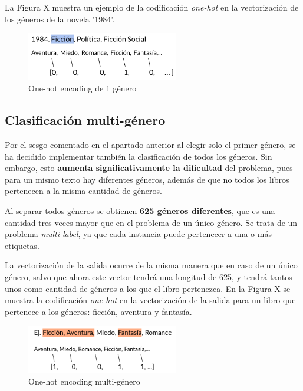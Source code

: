 \documentclass[12pt,a4paper, xcolor=table]{article}
\begin{document}
\vspace{3mm}

La Figura X muestra un ejemplo de la codificación \textit{one-hot} en la vectorización de los géneros de la novela '1984'.

  \begin{figure}[!h]
    \centering
    \includegraphics[width=250px]{img/1984_Genres.png}
    \caption{One-hot encoding de 1 género}
    \end{figure}

\newpage

\subsection{Clasificación multi-género}
Por el sesgo comentado en el apartado anterior al elegir solo el primer género, se ha decidido implementar también la clasificación de todos los géneros. Sin embargo, esto \textbf{aumenta significativamente la dificultad} del problema, pues para un mismo texto hay diferentes géneros, además de que no todos los libros pertenecen a la misma cantidad de géneros.

\vspace{3mm}

Al separar todos géneros se obtienen \textbf{625 géneros diferentes}, que es una cantidad tres veces mayor que en el problema de un único género. Se trata de un problema \textit{multi-label}, ya que cada instancia puede pertenecer a una o más etiquetas.

\vspace{3mm}

La vectorización de la salida ocurre de la misma manera que en caso de un único género, salvo que ahora este vector tendrá una longitud de 625, y tendrá tantos unos como cantidad de géneros a los que el libro pertenezca. En la Figura X se muestra la codificación \textit{one-hot} en la vectorización de la salida para un libro que pertenece a los géneros: ficción, aventura y fantasía.

  \begin{figure}[!h]
    \centering
    \includegraphics[width=250px]{img/ej_one_hot_multi.png}
    \caption{One-hot encoding multi-género}
    \end{figure}
\end{document}

